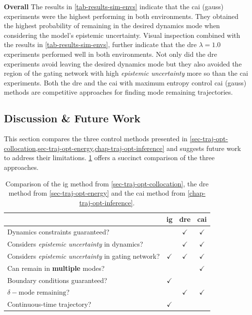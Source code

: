 \documentclass{mimosis-class/mimosis}
\numberwithin{equation}{chapter}
\begin{document}
{\textbf{Overall}
The results in \cref{tab-results-sim-envs} indicate that the \acrshort{cai} (gauss) experiments were the highest performing
in both environments.
They obtained the highest probability of remaining in the desired dynamics mode when considering the model's epistemic
uncertainty.
Visual inspection combined with the results in \cref{tab-results-sim-envs}, further
indicate that the \acrshort{dre} \(\lambda=1.0\) experiments performed well in both environments.
Not only did the \acrshort{dre} experiments avoid leaving the desired dynamics mode but they also avoided the region
of the gating network with high \emph{epistemic uncertainty} more so than the \acrshort{cai} experiments.
Both the \acrfull{dre} and the \acrfull{cai} with maximum entropy control
\acrshort{cai} (gauss) methods are competitive approaches for finding mode remaining trajectories.

\subsection{Discussion \& Future Work}
\label{sec:org5afd30a}
This section compares the three control methods presented in
\cref{sec-traj-opt-collocation,sec-traj-opt-energy,chap-traj-opt-inference}
and suggests future work to address their limitations.
\cref{tab-geometry-control-comparison} offers a succinct comparison of the three approaches.


\begin{table}
\caption[Comparison of mode remaining trajectory optimisation algorithms]{Comparison of the \acrfull{ig} method from \cref{sec-traj-opt-collocation}, the \acrfull{dre} method from \cref{sec-traj-opt-energy} and the \acrfull{cai} method from \cref{chap-traj-opt-inference}.}
\label{tab-geometry-control-comparison}
\begin{center}
\begin{tabular}{lccc}
 & \acrshort{ig} & \acrshort{dre} & \acrshort{cai}\\
\hline
Dynamics constraints guaranteed? & \texttimes{} & \(\checkmark\) & \(\checkmark\)\\
Considers \emph{epistemic uncertainty} in dynamics? & \texttimes{} & \(\checkmark\) & \(\checkmark\)\\
Considers \emph{epistemic uncertainty} in gating network? & \(\checkmark\) & \(\checkmark\) & \(\checkmark\)\\
Can remain in \textbf{multiple} modes? & \texttimes{} & \texttimes{} & \(\checkmark\)\\
Boundary conditions guaranteed? & \(\checkmark\) & \texttimes{} & \texttimes{}\\
\(\delta-\text{mode remaining}\)? & \texttimes{} & \(\checkmark\) & \(\checkmark\)\\
Continuous-time trajectory? & \(\checkmark\) & \texttimes{} & \texttimes{}\\
\end{tabular}
\end{center}
\end{table}

}
\end{document}
